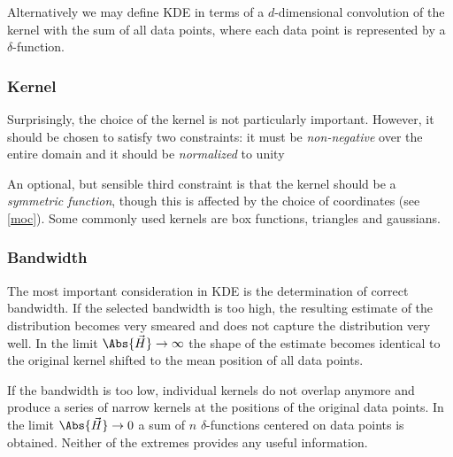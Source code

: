         Alternatively we may define KDE in terms of a $d$-dimensional convolution of the kernel with the sum of all data points,
        where each data point is represented by a $\delta$-function.

        \subsubsection{Kernel} \label{mmkk}
            Surprisingly, the choice of the kernel is not particularly important.
            However, it should be chosen to satisfy two constraints: it must be
            \emph{non-negative} over the entire domain
            and it should be \emph{normalized} to unity

            An optional, but sensible third constraint is that the kernel should be a \emph{symmetric function},
            though this is affected by the choice of coordinates (see \cref{moc}).
            Some commonly used kernels are box functions, triangles and gaussians.

        \subsubsection{Bandwidth} \label{mmkw}
            The most important consideration in KDE is the determination of correct bandwidth.
            If the selected bandwidth is too high, the resulting estimate of the distribution
            becomes very smeared and does not capture the distribution very well.
            In the limit $\Abs{\vec{H}} \to \infty$ the shape of the estimate becomes identical to the original kernel
            shifted to the mean position of all data points.

            If the bandwidth is too low, individual kernels do not overlap anymore and produce a series
            of narrow kernels at the positions of the original data points. In the limit $\Abs{\vec{H}} \to 0$
            a sum of $n$ $\delta$-functions centered on data points is obtained.
            Neither of the extremes provides any useful information.

